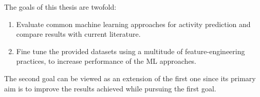The goals of this thesis are twofold: 
\begin{enumerate}
    \item Evaluate common machine learning approaches for activity prediction 
    and compare results with current literature.
    \item Fine tune the provided datasets using a multitude of feature-engineering practices,
    to increase performance of the ML approaches. 
\end{enumerate}

The second goal can be viewed as an extension of the first one since its primary aim is to
improve the results achieved while pursuing the first goal.
